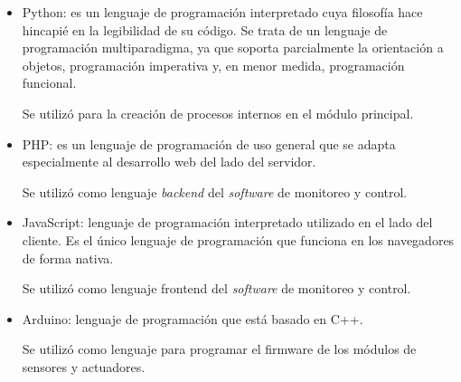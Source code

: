 \vspace{0.5cm}

\begin{itemize}
\item Python: es un lenguaje de programación interpretado cuya filosofía hace hincapié en la legibilidad de su código. Se trata de un lenguaje de programación multiparadigma, ya que soporta parcialmente la orientación a objetos, programación imperativa y, en menor medida, programación funcional.

Se utilizó para la creación de procesos internos en el módulo principal. 
\item PHP: es un lenguaje de programación de uso general que se adapta especialmente al desarrollo web del lado del servidor.

Se utilizó como lenguaje \emph{backend} del \emph{software} de monitoreo y control.
\item JavaScript: lenguaje de programación interpretado utilizado en el lado del cliente. Es el único lenguaje de programación que funciona en los navegadores de forma nativa.

Se utilizó como lenguaje frontend del \emph{software} de monitoreo y control.
\item Arduino: lenguaje de programación que está basado en C++.

Se utilizó como lenguaje para programar el firmware de los módulos de sensores y actuadores.
\end{itemize}